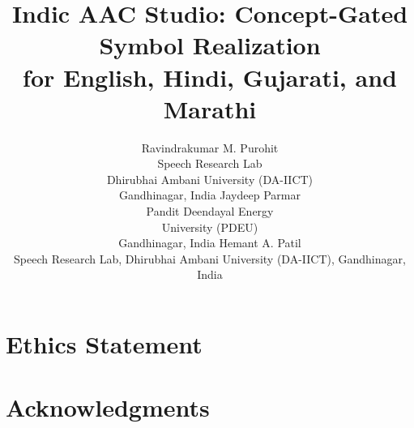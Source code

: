 \documentclass[11pt]{article}
\title{Indic AAC Studio: Concept-Gated Symbol Realization\\for English, Hindi, Gujarati, and Marathi}
\author{Ravindrakumar M. Purohit \\
  Speech Research Lab \\
  Dhirubhai Ambani University (DA-IICT) \\
  Gandhinagar, India
  \And
  Jaydeep Parmar \\
  Pandit Deendayal Energy \\
  University (PDEU) \\
  Gandhinagar, India
  \AND
  Hemant A. Patil \\
  Speech Research Lab, Dhirubhai Ambani University (DA-IICT), Gandhinagar, India}
\begin{document}
\maketitle






\section*{Ethics Statement}

\section*{Acknowledgments}


\clearpage
\appendix
\twocolumn[]

\end{document}
